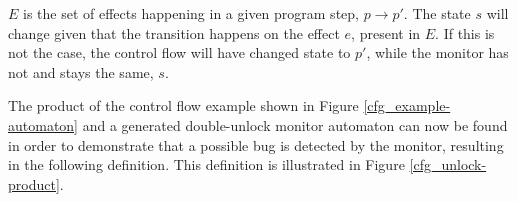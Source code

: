 \begin{center}
\begin{prooftree}
\end{prooftree}
\hspace{2cm}
\begin{prooftree}
\end{prooftree}
\end{center}

\newpar $E$ is the set of effects happening in a given program step, $p \rightarrow p'$. The state $s$ will change given that the transition happens on the effect $e$, present in $E$. If this is not the case, the control flow will have changed state to $p'$, while the monitor has not and stays the same, $s$. 


\newpar The product of the control flow example shown in Figure \ref{cfg_example-automaton} and a generated double-unlock monitor automaton can now be found in order to demonstrate that a possible bug is detected by the monitor, resulting in the following definition. This definition is illustrated in Figure \ref{cfg_unlock-product}. 

